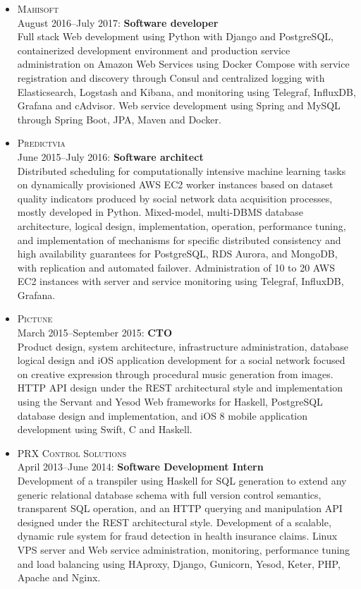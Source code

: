 \documentclass{res}
\begin{document}
\begin{resume}
\begin{itemize}[leftmargin=-0.3in]
    \item
      \textsc{Mahisoft}
      \\ August 2016--July 2017: \textbf{Software developer}
      \\ \small{Full stack Web development using Python with Django and PostgreSQL, containerized development environment and production service administration on Amazon Web Services using Docker Compose with service registration and discovery through Consul and centralized logging with Elasticsearch, Logstash and Kibana, and monitoring using Telegraf, InfluxDB, Grafana and cAdvisor.  Web service development using Spring and MySQL through Spring Boot, JPA, Maven and Docker.}

    \item
      \textsc{Predictvia}
      \\ June 2015--July 2016: \textbf{Software architect}
      \\ \small{Distributed scheduling for computationally intensive machine learning tasks on dynamically provisioned AWS EC2 worker instances based on dataset quality indicators produced by social network data acquisition processes, mostly developed in Python.  Mixed-model, multi-DBMS database architecture, logical design, implementation, operation, performance tuning, and implementation of mechanisms for specific distributed consistency and high availability guarantees for PostgreSQL, RDS Aurora, and MongoDB, with replication and automated failover.  Administration of 10 to 20 AWS EC2 instances with server and service monitoring using Telegraf, InfluxDB, Grafana.}

    \item
      \textsc{Pictune}
      \\ March 2015--September 2015: \textbf{CTO}
      \\ \small{Product design, system architecture, infrastructure administration, database logical design and iOS application development for a social network focused on creative expression through procedural music generation from images.  HTTP API design under the REST architectural style and implementation using the Servant and Yesod Web frameworks for Haskell, PostgreSQL database design and implementation, and iOS 8 mobile application development using Swift, C and Haskell.}

    \item
      \textsc{PRX Control Solutions}
      \\ April 2013--June 2014: \textbf{Software Development Intern}
      \\ \small{Development of a transpiler using Haskell for SQL generation to extend any generic relational database schema with full version control semantics, transparent SQL operation, and an HTTP querying and manipulation API designed under the REST architectural style.  Development of a scalable, dynamic rule system for fraud detection in health insurance claims.  Linux VPS server and Web service administration, monitoring, performance tuning and load balancing using HAproxy, Django, Gunicorn, Yesod, Keter, PHP, Apache and Nginx.}


\end{itemize}
\end{resume}
\end{document}
